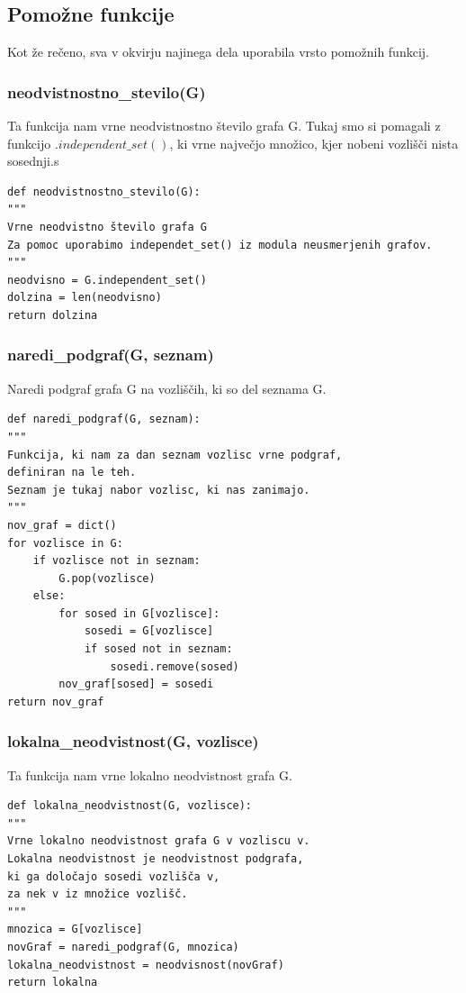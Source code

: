 \documentclass[12pt,a4paper]{amsart}
\theoremstyle{definition} %
\theoremstyle{plain} %
\begin{document}
\subsection{Pomožne funkcije}
Kot že rečeno, sva v okvirju najinega dela uporabila vrsto pomožnih funkcij. 
\subsubsection{neodvistnostno\_stevilo(G)}
Ta funkcija nam vrne neodvistnostno število grafa G. Tukaj smo si pomagali z funkcijo $.independent\_set()$, ki vrne največjo množico, kjer nobeni vozlišči nista sosednji.s 
\begin{verbatim}
def neodvistnostno_stevilo(G):
"""
Vrne neodvistno število grafa G
Za pomoc uporabimo independet_set() iz modula neusmerjenih grafov.
"""
neodvisno = G.independent_set()
dolzina = len(neodvisno)
return dolzina
\end{verbatim}

\subsubsection{naredi\_podgraf(G, seznam)}
Naredi podgraf grafa G na vozliščih, ki so del seznama G.
\begin{verbatim}
def naredi_podgraf(G, seznam):
"""
Funkcija, ki nam za dan seznam vozlisc vrne podgraf, 
definiran na le teh.
Seznam je tukaj nabor vozlisc, ki nas zanimajo.
"""
nov_graf = dict()
for vozlisce in G:
    if vozlisce not in seznam:
        G.pop(vozlisce)
    else:
        for sosed in G[vozlisce]:
            sosedi = G[vozlisce]
            if sosed not in seznam:
                sosedi.remove(sosed)
        nov_graf[sosed] = sosedi
return nov_graf

\end{verbatim}

\subsubsection{lokalna\_neodvistnost(G, vozlisce)}
Ta funkcija nam vrne lokalno neodvistnost grafa G.
\begin{verbatim}
def lokalna_neodvistnost(G, vozlisce):
"""
Vrne lokalno neodvistnost grafa G v vozliscu v.
Lokalna neodvistnost je neodvistnost podgrafa, 
ki ga določajo sosedi vozlišča v,
za nek v iz množice vozlišč.
"""
mnozica = G[vozlisce]
novGraf = naredi_podgraf(G, mnozica)
lokalna_neodvistnost = neodvisnost(novGraf)
return lokalna
\end{verbatim}
\end{document}
